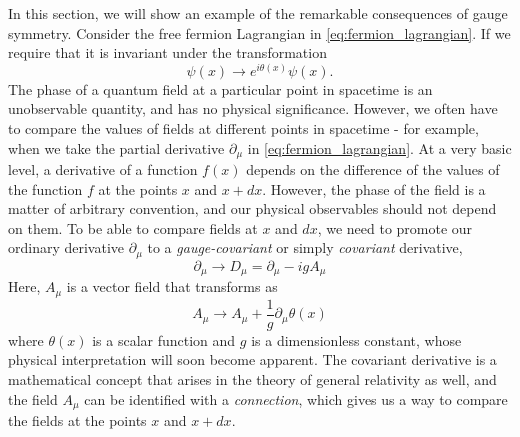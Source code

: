  In this section, we will show an example of the remarkable consequences of gauge symmetry. Consider the free fermion Lagrangian in \autoref{eq:fermion_lagrangian}. If we require that it is invariant under the transformation
\begin{equation}\label{eq:fermion_field_transformation}
  \psi(x)\rightarrow e^{i\theta(x)}\psi(x).
\end{equation}
The phase of a quantum field at a particular point in spacetime is an unobservable quantity, and has no physical significance. However, we often have to compare the values of fields at different points in spacetime - for example, when we take the partial derivative $\partial_\mu$ in \autoref{eq:fermion_lagrangian}. At a very basic level, a derivative of a function $f(x)$ depends on the difference of the values of the function $f$ at the points $x$ and $x + dx$. However, the phase of the field is a matter of arbitrary convention, and our physical observables should not depend on them. To be able to compare fields at $x$ and $dx$, we need to promote our ordinary derivative $\partial_\mu$ to a \emph{gauge-covariant} or simply \emph{covariant} derivative,
$$\partial_\mu \rightarrow D_\mu = \partial_\mu - igA_\mu$$
Here, $A_\mu$ is a vector field that transforms as%
%
$$A_\mu\rightarrow A_\mu + \frac{1}{g}\partial_\mu\theta(x)$$
%
where $\theta(x)$ is a scalar function and $g$ is a dimensionless constant, whose physical interpretation will soon become apparent. The covariant derivative is a mathematical concept that arises in the theory of general relativity as well, and the field $A_\mu$ can be identified with a \emph{connection}, which gives us a way to compare the fields at the points $x$ and $x + dx$.

